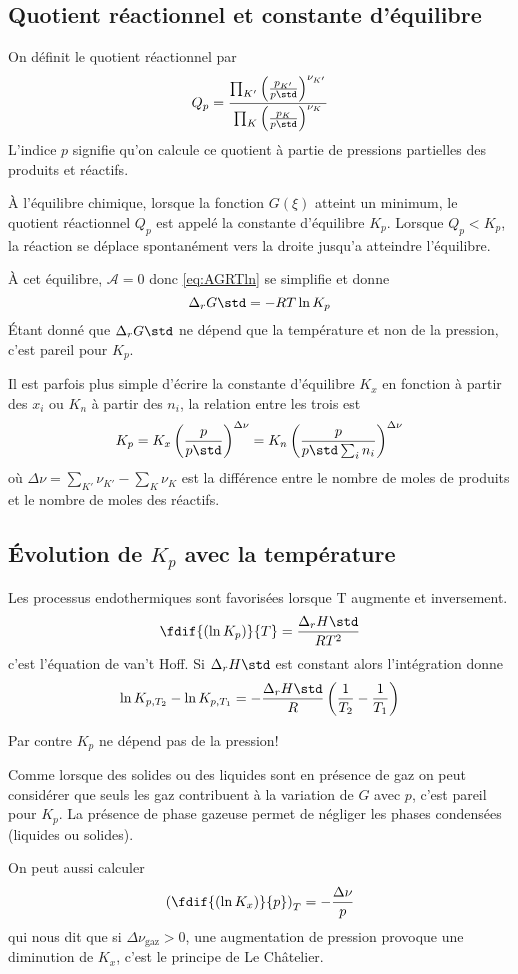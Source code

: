 \subsection{Quotient réactionnel et constante d'équilibre}
On définit le quotient réactionnel par
\[ Q_p = \frac {\prod_{K'}\left(\frac{p_{K'}}{p\std}\right)^{\nu_{K'}}}
{\prod_{K}\left(\frac{p_{K}}{p\std}\right)^{\nu_{K}}} \]
L'indice $p$ signifie qu'on calcule ce quotient
à partie de pressions partielles des produits et réactifs.

À l'équilibre chimique, lorsque la fonction $G(\xi)$ atteint un minimum,
le quotient réactionnel $Q_p$ est appelé la constante d'équilibre $K_p$.
Lorsque $Q_p < K_p$, la réaction se déplace spontanément
vers la droite jusqu'a atteindre l'équilibre.

À cet équilibre, $\mathcal{A} = 0$ donc \eqref{eq:AGRTln} se simplifie
et donne
\[ \Delta_rG\std = -RT\ln K_p \]
Étant donné que $\Delta_rG\std$ ne dépend que la température et
non de la pression, c'est pareil pour $K_p$.

Il est parfois plus simple d'écrire la constante d'équilibre $K_x$
en fonction à partir des $x_i$ ou $K_n$ à partir des $n_i$,
la relation entre les trois est
\[ K_p = K_x\left(\frac{p}{p\std}\right)^{\Delta \nu} =
K_n \left(\frac{p}{p\std\sum_i n_i}\right)^{\Delta \nu} \]
où $\Delta \nu = \sum_{K'}\nu_{K'}-\sum_K \nu_K$ est la différence entre
le nombre de moles de produits et le nombre de moles des réactifs.

\subsection{Évolution de $K_p$ avec la température}
Les processus endothermiques sont favorisées lorsque T augmente et inversement.
\[ \fdif{(\ln K_p)}{T} = \frac{\Delta_rH\std}{RT^2} \]
c'est l'équation de van't Hoff.
Si $\Delta_rH\std$ est constant alors l'intégration donne
\[ \ln K_{p,T_2}-\ln K_{p,T_1} = -\frac{\Delta_rH\std}{R}\left(\frac{1}{T_2}-
\frac{1}{T_1}\right) \]

Par contre $K_p$ ne dépend pas de la pression!

Comme lorsque des solides ou des liquides sont en présence de gaz on peut
considérer que seuls les gaz contribuent à la variation de $G$ avec $p$,
c'est pareil pour $K_p$.
La présence de phase gazeuse permet de négliger
les phases condensées (liquides ou solides).

On peut aussi calculer
\[ \left(\fdif{(\ln K_x)}{p}\right)_T = -\frac{\Delta\nu}{p} \]
qui nous dit que si $\Delta\nu_\mathrm{gaz} > 0$, une augmentation
de pression provoque une diminution de $K_x$, c'est le principe de Le
Châtelier.

